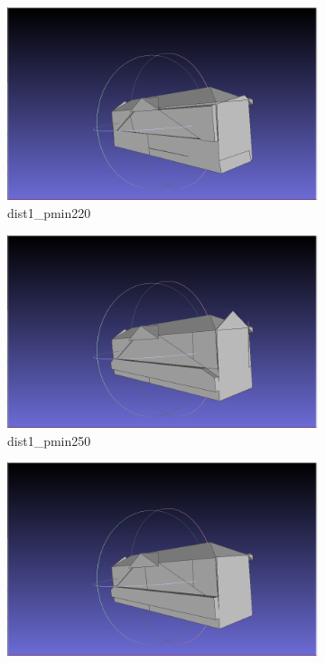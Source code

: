 \documentclass{article}
\begin{document}
\begin{figure}[H]
  \centering
  \begin{subfigure}[b]{0.45\textwidth}
    \includegraphics[width=\textwidth]{../../images/screen_kinetic/dist1_pmin220.png}
    \caption{dist1\_pmin220}
    \label{fig:dist1_pmin220}
  \end{subfigure}
  \hfill
  \begin{subfigure}[b]{0.45\textwidth}
    \includegraphics[width=\textwidth]{../../images/screen_kinetic/dist1_pmin250.png}
    \caption{dist1\_pmin250}
    \label{fig:dist1_pmin250}
  \end{subfigure}
  \vfill
  \begin{subfigure}[b]{0.45\textwidth}
    \includegraphics[width=\textwidth]{../../images/screen_kinetic/dist1_pmin280.png}

\end{subfigure}
\end{figure}
\end{document}
